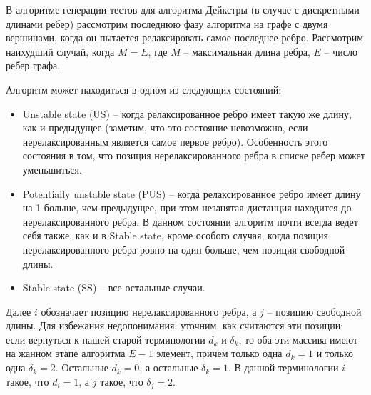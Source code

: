\documentclass[a4paper,10pt]{article}
\begin{document}
В алгоритме генерации тестов для алгоритма Дейкстры (в случае с дискретными длинами ребер) рассмотрим последнюю фазу алгоритма на графе с двумя вершинами, когда он пытается релаксировать самое последнее ребро. Рассмотрим наихудший случай, когда $M =E$, где $M$ -- максимальная длина ребра, $E$ -- число ребер графа.

Алгоритм может находиться в одном из следующих состояний:
\begin{itemize}
 \item Unstable state (US) -- когда релаксированное ребро имеет такую же длину, как и предыдущее (заметим, что это состояние невозможно, если нерелаксированным является самое первое ребро). Особенность этого состояния в том, что позиция нерелаксированного ребра в списке ребер может уменьшиться.
 \item Potentially unstable state (PUS) -- когда релаксированное ребро имеет длину на 1 больше, чем предыдущее, при этом незанятая дистанция находится до нерелаксированного ребра. В данном состоянии алгоритм почти всегда ведет себя также, как и в Stable state, кроме особого случая, когда позиция нерелаксированного ребра ровно на один больше, чем позиция свободной длины.
 \item Stable state (SS) -- все остальные случаи.
\end{itemize}

Далее $i$ обозначает позицию нерелаксированного ребра, а $j$ -- позицию свободной длины. Для избежания недопонимания, уточним, как считаются эти позиции: если вернуться к нашей старой терминологии $d_k$ и $\delta_k$, то оба эти массива имеют на жанном этапе алгоритма $E - 1$ элемент, причем только одна $d_k = 1$ и только одна $\delta_k = 2$. Остальные $d_k = 0$, а остальные $\delta_k = 1$. В данной терминологии $i$ такое, что $d_i = 1$, а $j$ такое, что $\delta_j = 2$.
\end{document}
